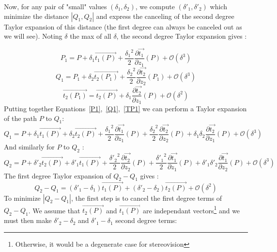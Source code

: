 \documentclass{ipol}
\newcommand{\BigV}[1]{\ensuremath{\overrightarrow{#1}}}
\newcommand{\TanO}[1]{\BigV{t_1#1}}
\newcommand{\TanT}[1]{\BigV{t_2#1}}
\newcommand{\Negl}[1]{\ensuremath{\mathcal{O}(#1)}}
\newcommand{\DerPart}[2]{\frac{\partial #1}{\partial #2}}
\begin{document}
Now, for any pair of "small" values $(\delta_1,\delta_2)$,  we  compute 
$(\delta'_1,\delta'_2)$ which minimize the distance $|Q_1,Q_2|$ and express the canceling of the
second degree Taylor expansion of this distance (the first degree can always be canceled out as we will see).  Noting $\delta$ the max of all $\delta$, the second degree Taylor expansion gives :

\begin{equation}
    P_1 =  P +  \delta_1 \TanO{(P)} + \frac{{\delta_1}^2}{2} \DerPart { \TanO{}}{z_1}(P)  + \Negl{\delta^3} \label{P1} 
\end{equation}
\begin{equation}
    Q_1 =  P_1 +  \delta_2 \TanT{(P_1)} + \frac{{\delta_2}^2}{2} \DerPart { \TanT{}}{z_2}(P_1) + \Negl{\delta^3} \label{Q1}
\end{equation}
\begin{equation}
     \TanT{(P_1)} = \TanT{(P)} +  \delta_1   \DerPart { \TanT{}}{z_1}(P) + \Negl{\delta^2} \label{TP1}
\end{equation}
%
Putting together Equations~\eqref{P1},~\eqref{Q1},~\eqref{TP1} we can perform a Taylor expansion of the path
$P$ to $Q_1$:
\begin{equation}
    Q_1 =    P +  \delta_1 \TanO{(P)} 
               +  \delta_2 \TanT{(P)} 
               + \frac{{\delta_1}^2}{2} \DerPart { \TanO{}}{z_1}(P) 
               + \frac{{\delta_2}^2}{2} \DerPart { \TanT{}}{z_2}(P) 
               +  \delta_1  \delta_2  \DerPart { \TanT{}}{z_1}(P)  
               + \Negl{\delta^3}
       \label{Q1ofP}
\end{equation}
%
And similarly for $P$ to $Q_2$ :
%
\begin{equation}
    Q_2 =    P +  \delta'_2 \TanT{(P)} 
               +  \delta'_1 \TanO{(P)} 
               + \frac{{\delta'_2}^2}{2} \DerPart { \TanT{}}{z_2}(P) 
               + \frac{{\delta'_1}^2}{2} \DerPart { \TanO{}}{z_1}(P) 
               +  \delta'_1  \delta'_2  \DerPart { \TanO{}}{z_2}(P)  
               + \Negl{\delta^3}
       \label{Q2ofP}
\end{equation}
%
The first degree Taylor expansion of $Q_2-Q_1$ gives :
%
\begin{equation}
    Q_2 -Q_1 =   (\delta'_1 -\delta_1) \TanO{(P)} +  (\delta'_2 -\delta_2) \TanT{(P)}  + \Negl{\delta^2}
\end{equation}
%
To minimize $|Q_2 -Q_1|$, the first step is to cancel the first degree  terms of $ Q_2 -Q_1$. We assume
that $\TanT{(P)}$ and $\TanO{(P)}$  are independant vectors\footnote{Otherwise, it would be a 
degenerate case for stereovision} and we must then make $\delta'_2 -\delta_2$ and $\delta'_1 -\delta_1$ second degree terms:
\end{document}
